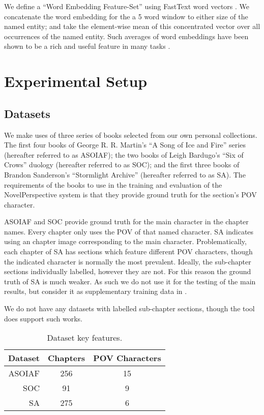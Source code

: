\documentclass[11pt,a4paper]{article}
\newcommand{\parencite}{\citep}
\begin{document}
We define a ``Word Embedding Feature-Set'' using FastText word vectors \parencite{bojanowski2016enriching}.
We concatenate the word embedding for the a 5 word window to either size of the named entity;
and take the element-wise mean of this concentrated vector over all occurrences of the named entity.
Such averages of word embeddings have been shown to be a rich and useful feature in many tasks \cite{White2015SentVecMeaning,mikolovSkip}.





\section{Experimental Setup}\label{sec:experimental-setup}
\subsection{Datasets}
We make uses of three series of books selected from our own personal collections.
The first four books of George R. R. Martin's ``A Song of Ice and Fire'' series (hereafter referred to as ASOIAF);
the two books of  Leigh Bardugo's ``Six of Crows'' duology (hereafter referred to as SOC);
and the first three books of Brandon Sanderson's ``Stormlight Archive'' (hereafter referred to as SA).
The requirements of the books to use in the training and evaluation of the NovelPerspective system is that they provide ground truth for the section's POV  character.

ASOIAF and SOC provide ground truth for the main character in the chapter names.
Every chapter only uses the POV of that named character.
SA indicates using an chapter image corresponding to the main character.
Problematically, each chapter of SA has sections which feature different POV characters, though the indicated character is normally the most prevalent.
Ideally, the sub-chapter sections individually labelled, however they are not.
For this reason the ground truth of SA is much weaker.
As such we do not use it for the testing of the main results,
but consider it as supplementary training data in .

We do not have any datasets with labelled sub-chapter sections, though the tool does support such works.


\begin{table}
	\begin{tabular}{rcc}
		Dataset & Chapters & POV Characters\\
		\toprule
		ASOIAF  & 256	&	15\\
		SOC		& 91	&	9\\
		SA		& 275	&	6
	\end{tabular}
	\caption{Dataset key features. \label{tbl:datasets}}
\end{table}
\end{document}
